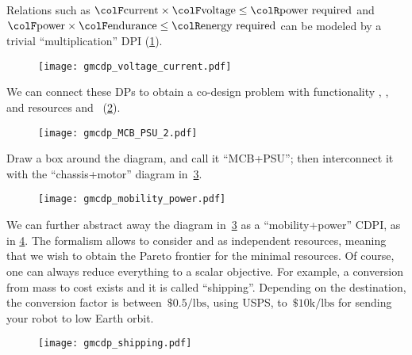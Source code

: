 \begin{example}

  Relations such as ${\colF\mbox{current}}\times{\colF\mbox{voltage}}\leq{\colR\mbox{power required}}$
  and ${\colF\mbox{power}}\times{\colF\mbox{endurance}}\leq{\colR\mbox{energy required}}$
  can be modeled by a trivial ``multiplication'' DPI (\cref{fig:current_times_voltage}).

  \begin{figure}[h]
    \centering
    \texttt{[image: gmcdp\_voltage\_current.pdf]}
    \caption{\label{fig:current_times_voltage}}
  \end{figure}


  We can connect these DPs to obtain a co-design problem with
  functionality , ,  and resources
   and ~(\cref{fig:connect}).

  \begin{figure}[h]
    \centering
    \texttt{[image: gmcdp\_MCB\_PSU\_2.pdf]}
    \caption{\label{fig:connect}}
  \end{figure}


  Draw a box around the diagram, and call it ``MCB+PSU'';
  then interconnect it with the ``chassis+motor'' diagram in~\cref{fig:another}.


  \begin{figure}[h]
    \begin{centering}
      \texttt{[image: gmcdp\_mobility\_power.pdf]}
    \end{centering}
    \caption{\label{fig:another}}
  \end{figure}

  We can further abstract away the diagram in~\cref{fig:another} as
  a ``mobility+power'' CDPI, as in \cref{fig:shipping}. The formalism
  allows to consider  and  as independent resources,
  meaning that we wish to obtain the Pareto frontier for the minimal
  resources. Of course, one can always reduce everything to a scalar
  objective. For example, a conversion from mass to cost exists and
  it is called ``shipping''. Depending on the destination, the conversion
  factor is between~$\$0.5/\mbox{lbs}$, using USPS, to~$\$10\mbox{k}/\mbox{lbs}$
  for sending your robot to low Earth orbit.


  \begin{figure}[h]
    \centering{}\texttt{[image: gmcdp\_shipping.pdf]}\caption{\label{fig:shipping}}
  \end{figure}

\end{example}

